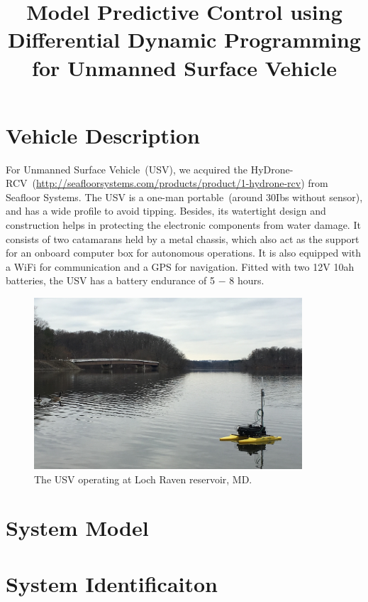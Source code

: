 \documentclass[]{article}
\begin{document}
\title{Model Predictive Control using Differential Dynamic Programming for Unmanned Surface Vehicle}
\maketitle

\section{Vehicle Description}

For Unmanned Surface Vehicle~(USV), we acquired the HyDrone-RCV~(\url{http://seafloorsystems.com/products/product/1-hydrone-rcv}) from Seafloor Systems. The USV is a one-man portable~(around 30Ibs without sensor), and has a wide profile to avoid tipping. Besides, its watertight design and construction helps in protecting the electronic components from water damage. It consists of two catamarans held by a metal chassis, which also act as the support for an onboard computer box for autonomous operations. It is also equipped with a WiFi for communication and a GPS for navigation. Fitted with two 12V 10ah batteries, the USV has a battery endurance of 5 $-$ 8 hours.  

\begin{figure}[h]
\centering
\includegraphics[width=10cm]{img/IMG_2515.JPG}
\caption{The USV operating at Loch Raven reservoir, MD.}
\label{fig:usv}
\end{figure} 



\section{System Model}




\section{System Identificaiton}
\end{document}
